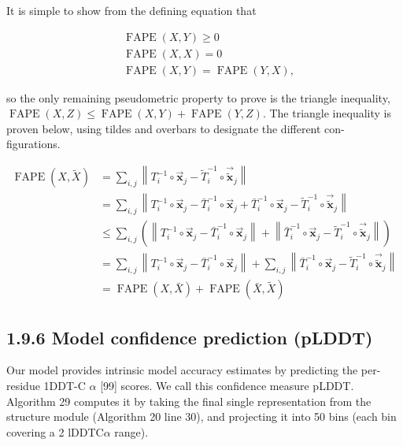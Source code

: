 \documentclass[10pt]{article}
\begin{document}
It is simple to show from the defining equation that


\begin{align*}
& \operatorname{FAPE}(X, Y) \geq 0  \tag{23}\\
& \operatorname{FAPE}(X, X)=0  \tag{24}\\
& \operatorname{FAPE}(X, Y)=\operatorname{FAPE}(Y, X), \tag{25}
\end{align*}


so the only remaining pseudometric property to prove is the triangle inequality, $\operatorname{FAPE}(X, Z) \leq \operatorname{FAPE}(X, Y)+ \operatorname{FAPE}(Y, Z)$. The triangle inequality is proven below, using tildes and overbars to designate the different con-\\
figurations.


\begin{align*}
\operatorname{FAPE}(X, \tilde{X}) & =\sum_{i, j}\left\|T_{i}^{-1} \circ \overrightarrow{\mathbf{x}}_{j}-\tilde{T}_{i}^{-1} \circ \overrightarrow{\tilde{\mathbf{x}}}_{j}\right\|  \tag{26}\\
& =\sum_{i, j}\left\|T_{i}^{-1} \circ \overrightarrow{\mathbf{x}}_{j}-\bar{T}_{i}^{-1} \circ \overrightarrow{\mathbf{x}}_{j}+\bar{T}_{i}^{-1} \circ \overrightarrow{\mathbf{x}}_{j}-\tilde{T}_{i}^{-1} \circ \overrightarrow{\tilde{\mathbf{x}}}_{j}\right\|  \tag{27}\\
& \leq \sum_{i, j}\left(\left\|T_{i}^{-1} \circ \overrightarrow{\mathbf{x}}_{j}-\bar{T}_{i}^{-1} \circ \overrightarrow{\mathbf{x}}_{j}\right\|+\left\|\bar{T}_{i}^{-1} \circ \overrightarrow{\mathbf{x}}_{j}-\tilde{T}_{i}^{-1} \circ \overrightarrow{\tilde{\mathbf{x}}}_{j}\right\|\right)  \tag{28}\\
& =\sum_{i, j}\left\|T_{i}^{-1} \circ \overrightarrow{\mathbf{x}}_{j}-\bar{T}_{i}^{-1} \circ \overrightarrow{\mathbf{x}}_{j}\right\|+\sum_{i, j}\left\|\bar{T}_{i}^{-1} \circ \overrightarrow{\mathbf{x}}_{j}-\tilde{T}_{i}^{-1} \circ \overrightarrow{\tilde{\mathbf{x}}}_{j}\right\|  \tag{29}\\
& =\operatorname{FAPE}(X, \bar{X})+\operatorname{FAPE}(\bar{X}, \tilde{X}) \tag{30}
\end{align*}


\subsection*{1.9.6 Model confidence prediction (pLDDT)}
Our model provides intrinsic model accuracy estimates by predicting the per-residue 1DDT-C $\alpha$ [99] scores. We call this confidence measure pLDDT. Algorithm 29 computes it by taking the final single representation from the structure module (Algorithm 20 line 30), and projecting it into 50 bins (each bin covering a 2 lDDT$\mathrm{C} \alpha$ range).
\end{document}
